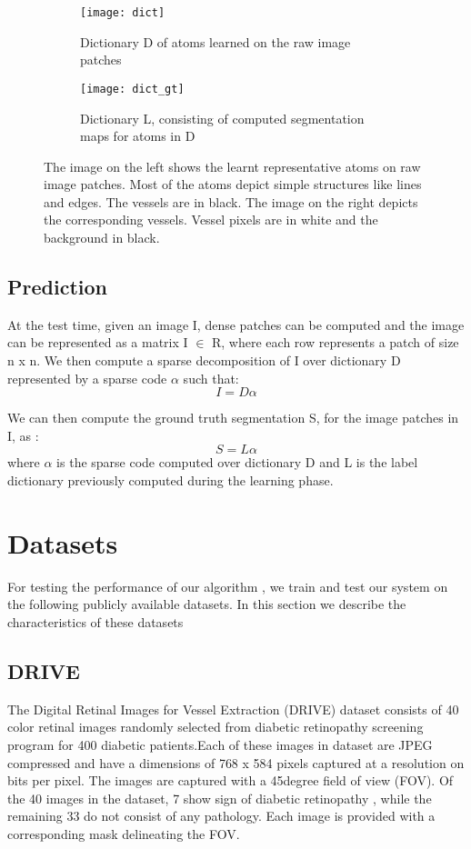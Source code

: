 \begin{figure}
	\begin{subfigure}[b]{0.45\textwidth}
		\texttt{[image: dict]}
		\caption{Dictionary D of atoms learned on the raw image patches}
		\label{fig:dict}
	\end{subfigure}
	\begin{subfigure}[b]{0.45\textwidth}
		\texttt{[image: dict\_gt]}
		\caption{Dictionary L, consisting of computed segmentation maps for atoms in D}
		\label{fig:dictgt}
	\end{subfigure}
	\caption[Dictionary of image atoms and segmentations]{The image on the left shows the learnt representative atoms on raw image patches. Most of the atoms depict simple structures like lines and edges. The vessels are in black. The image on the right depicts the corresponding vessels. Vessel pixels are in white and the background in black.}
	\label{fig:dl-cls}
\end{figure}
\clearpage
\subsection{Prediction}
At the test time, given an image I, dense patches can be computed and the image can be represented as a matrix I $\in$ R, where each row represents a patch of size n x n. We then compute a sparse decomposition of I over dictionary D represented by a sparse code $\alpha$ such that:
$$
I = D \alpha
$$

We can then compute the ground truth segmentation S, for the image patches in I, as :
$$
S = L\alpha
$$
where $\alpha$ is the sparse code computed over dictionary D and L is the label dictionary previously computed during the learning phase.

\section{Datasets}
For testing the performance of our algorithm , we train and test our system on the following publicly available datasets. In this section we describe the characteristics of these datasets

\subsection{DRIVE}
The Digital Retinal Images for Vessel Extraction (DRIVE) dataset \cite{drivedataset} consists of 40 color retinal images randomly selected from diabetic retinopathy screening program for 400 diabetic patients.Each of these images in dataset are JPEG compressed and have a dimensions of 768 x 584 pixels captured at a resolution on bits per pixel. The images are captured with a 45degree field of view (FOV).
Of the 40 images in the dataset, 7 show sign of diabetic retinopathy , while the remaining 33 do not consist of any pathology. Each image is provided with a corresponding mask delineating the FOV.\\

